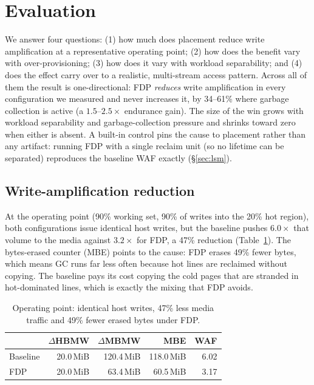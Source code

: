 \documentclass[conference,10pt]{IEEEtran}
\begin{document}
\section{Evaluation}
\label{sec:eval}
We answer four questions: (1) how much does placement reduce write
amplification at a representative operating point; (2) how does the benefit vary
with over-provisioning; (3) how does it vary with workload separability; and
(4) does the effect carry over to a realistic, multi-stream access pattern.
Across all of them the result is one-directional: FDP \emph{reduces} write
amplification in every configuration we measured and never increases it,
by 34--61\% where garbage collection is active (a $1.5$--$2.5\times$ endurance
gain). The size of the win grows with workload separability and garbage-collection
pressure and shrinks toward zero when either is absent. A built-in control
pins the cause to placement rather than any artifact: running FDP with a single
reclaim unit (so no lifetime can be separated) reproduces the baseline WAF
exactly (\S\ref{sec:lsm}).

\subsection{Write-amplification reduction}
At the operating point (90\% working set, 90\% of writes into the 20\% hot
region), both configurations issue identical host writes, but the baseline pushes
$6.0\times$ that volume to the media against $3.2\times$ for FDP, a 47\% reduction
(Table~\ref{tab:headline}). The bytes-erased counter (MBE) points to the cause:
FDP erases 49\% fewer bytes, which means GC runs far less often because hot lines
are reclaimed without copying. The baseline pays its cost copying the cold pages
that are stranded in hot-dominated lines, which is exactly the mixing that FDP
avoids.

\begin{table}[t]
\centering
\caption{Operating point: identical host writes, 47\% less media traffic and
49\% fewer erased bytes under FDP.}
\label{tab:headline}
\footnotesize
\begin{tabular}{lrrrr}
\toprule
 & $\Delta$HBMW & $\Delta$MBMW & MBE & WAF \\
\midrule
Baseline & 20.0\,MiB & 120.4\,MiB & 118.0\,MiB & 6.02 \\
FDP      & 20.0\,MiB & 63.4\,MiB  & 60.5\,MiB  & 3.17 \\
\bottomrule
\end{tabular}
\end{table}
\end{document}
